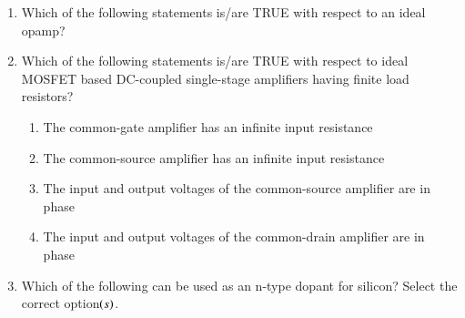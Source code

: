 \documentclass[journal,12pt,onecolumn]{IEEEtran}
\theoremstyle{remark}
\begin{document}
\begin{enumerate}
\hfill{}

\begin{enumerate}
\end{enumerate}

\item Which of the following statements is/are TRUE with respect to an ideal opamp?

\hfill{}

\begin{enumerate}
\end{enumerate}

\item Which of the following statements is/are TRUE with respect to ideal MOSFET based DC-coupled single-stage amplifiers having finite load resistors?

\hfill{}

\begin{enumerate}
\item The common-gate amplifier has an infinite input resistance
\item The common-source amplifier has an infinite input resistance
\item The input and output voltages of the common-source amplifier are in phase
\item The input and output voltages of the common-drain amplifier are in phase
\end{enumerate}

\item Which of the following can be used as an n-type dopant for silicon? Select the correct option$\left(s\right)$.

\hfill{}


\end{enumerate}
\end{document}
